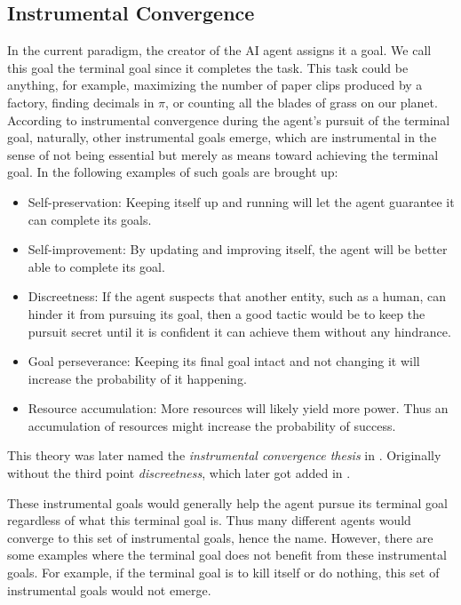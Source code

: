 \documentclass[12pt,A4]{report}
\theoremstyle{definition}
\begin{document}

\subsection{Instrumental Convergence}
In the current paradigm, the creator of the AI agent assigns it a goal. We call this goal the terminal goal since it completes the task. This task could be anything, for example, maximizing the number of paper clips produced by a factory, finding decimals in $\pi$, or counting all the blades of grass on our planet. According to instrumental convergence during the agent's pursuit of the terminal goal, naturally, other instrumental goals emerge, which are instrumental in the sense of not being essential but merely as means toward achieving the terminal goal. In \citet{Omohundro08} the following examples of such goals are brought up: 
\begin{itemize}
    \item Self-preservation: Keeping itself up and running will let the agent guarantee it can complete its goals.
    \item Self-improvement: By updating and improving itself, the agent will be better able to complete its goal.
    \item Discreetness: If the agent suspects that another entity, such as a human, can hinder it from pursuing its goal, then a good tactic would be to keep the pursuit secret until it is confident it can achieve them without any hindrance. 
    \item Goal perseverance: Keeping its final goal intact and not changing it will increase the probability of it happening. 
    \item Resource accumulation: More resources will likely yield more power. Thus an accumulation of resources might increase the probability of success.
\end{itemize}
This theory was later named the \textit{instrumental convergence thesis} in \citet{Bostrom12}. Originally without the third point \textit{discreetness}, which later got added in \citet{Bostrom14}.

These instrumental goals would generally help the agent pursue its terminal goal regardless of what this terminal goal is. Thus many different agents would converge to this set of instrumental goals, hence the name. However, there are some examples where the terminal goal does not benefit from these instrumental goals. For example, if the terminal goal is to kill itself or do nothing, this set of instrumental goals would not emerge. 
\end{document}
